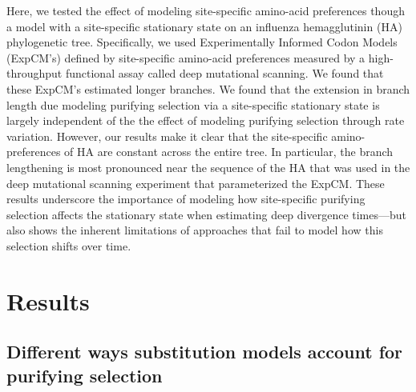 \documentclass[11pt]{article}
\begin{document}
Here, we tested the effect of modeling site-specific amino-acid preferences though a model with a site-specific stationary state on an influenza hemagglutinin (HA) phylogenetic tree. 
Specifically, we used Experimentally Informed Codon Models (ExpCM's) defined by site-specific amino-acid preferences measured by a high-throughput functional assay called deep mutational scanning. 
We found that these ExpCM's estimated longer branches. 
We found that the extension in branch length due modeling purifying selection via a site-specific stationary state is largely independent of the the effect of modeling purifying selection through rate variation. 
However, our results make it clear that the site-specific amino-preferences of HA are constant across the entire tree. 
In particular, the branch lengthening is most pronounced near the sequence of the HA that was used in the deep mutational scanning experiment that parameterized the ExpCM.
These results underscore the importance of modeling how site-specific purifying selection affects the stationary state when estimating deep divergence times---but also shows the inherent limitations of approaches that fail to model how this selection shifts over time. 


\section*{Results}

\subsection*{Different ways substitution models account for purifying selection}
\end{document}
